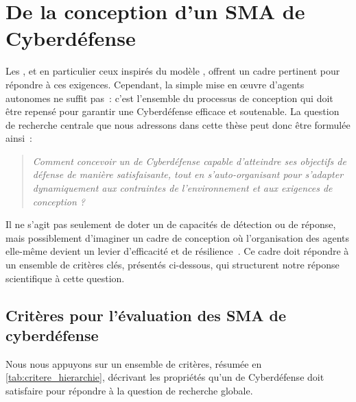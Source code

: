\section{De la conception d'un SMA de Cyberdéfense}\label{sec:problematique-sma}

Les , et en particulier ceux inspirés du modèle , offrent un cadre pertinent pour répondre à ces exigences. Cependant, la simple mise en œuvre d'agents autonomes ne suffit pas~: c'est l'ensemble du processus de conception qui doit être repensé pour garantir une Cyberdéfense efficace et soutenable.
La question de recherche centrale que nous adressons dans cette thèse peut donc être formulée ainsi~:

\begin{quote}
    \emph{Comment concevoir un  de Cyberdéfense capable d'atteindre ses objectifs de défense de manière satisfaisante, tout en s'auto-organisant pour s'adapter dynamiquement aux contraintes de l'environnement et aux exigences de conception ?}
\end{quote}

\noindent
Il ne s'agit pas seulement de doter un  de capacités de détection ou de réponse, mais possiblement d'imaginer un cadre de conception où l'organisation des agents elle-même devient un levier d'efficacité et de résilience~\cite{Picard2006, DiMarzoSerugendo2006}. Ce cadre doit répondre à un ensemble de critères clés, présentés ci-dessous, qui structurent notre réponse scientifique à cette question.

\subsection*{Critères pour l’évaluation des SMA de cyberdéfense}

%         

Nous nous appuyons sur un ensemble de critères, résumée en \autoref{tab:critere_hierarchie}, décrivant les propriétés qu’un  de Cyberdéfense doit satisfaire pour répondre à la question de recherche globale.

